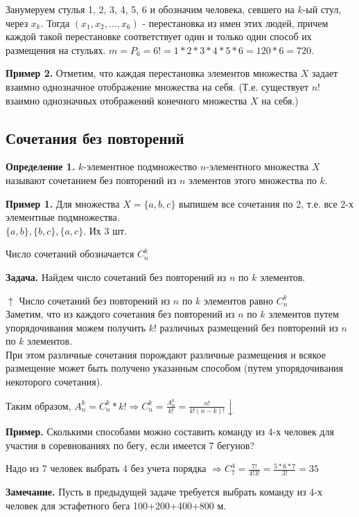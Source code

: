 \documentclass{article}
\begin{document}
    Занумеруем стулья 1, 2, 3, 4, 5, 6 и обозначим человека, севшего на \(k\)-ый стул, через \(x_k\).
    Тогда \((x_1, x_2, ..., x_6)\) - перестановка из имен этих людей, причем каждой такой перестановке соответствует один и только один способ их размещения на стульях.
    \(m = P_6 = 6! = 1*2*3*4*5*6 = 120*6 = 720\).

    \textbf{Пример 2.} Отметим, что каждая перестановка элементов множества \(X\) задает взаимно однозначное отображение множества на себя.
    (Т.е. существует \(n!\) взаимно однозначных отображений конечного множества \(X\) на себя.)

    \subsection{Сочетания без повторений}
    \textbf{Определение 1.} \(k\)-элементное подмножество \(n\)-элементного множества \(X\) называют сочетанием без повторений из \(n\) элементов этого множества по \(k\).

    \textbf{Пример 1.} Для множества \(X = \{a, b, c\}\) выпишем все сочетания по 2, т.е. все 2-х элементные подмножества.
    \\\(\{a, b\}, \{b, c\}, \{a, c\}\). Их 3 шт.

    Число сочетаний обозначается \(C_n^k\)

    \textbf{Задача.} Найдем число сочетаний без повторений из \(n\) по \(k\) элементов.

    \(\uparrow\) Число сочетаний без повторений из \(n\) по \(k\) элементов равно \(C_n^k\)
    \\Заметим, что из каждого сочетания без повторений из \(n\) по \(k\) элементов путем упорядочивания можем получить \(k!\) различных размещений без повторений из \(n\) по \(k\) элементов.
    \\При этом различные сочетания порождают различные размещения и всякое размещение может быть получено указанным способом (путем упорядочивания некоторого сочетания).

    Таким образом, \(A_n^k = C_n^k*k! \Rightarrow C_n^k = \frac{A_n^k}{k!} = \frac{n!}{k!(n-k)!} \downarrow\)

    \textbf{Пример.} Сколькими способами можно составить команду из 4-х человек для участия в соревнованиях по бегу, если имеется 7 бегунов?

    Надо из 7 человек выбрать 4 без учета порядка \(\Rightarrow C_7^4 = \frac{7!}{4!3!} = \frac{5*6*7}{3!} = 35\)

    \textbf{Замечание.} Пусть в предыдущей задаче требуется выбрать команду из 4-х человек для эстафетного бега 100+200+400+800 м.
\end{document}
